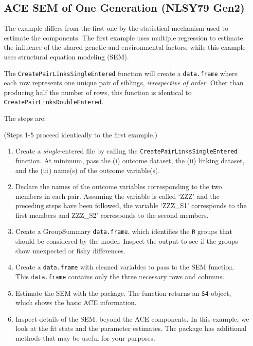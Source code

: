 \documentclass[smallextended]{svjour3}       %
\begin{document}
\hypertarget{ace-sem-of-one-generation-nlsy79-gen2}{%
\subsection{ACE SEM of One Generation (NLSY79
Gen2)}\label{ace-sem-of-one-generation-nlsy79-gen2}}

The example differs from the first one by the statistical mechanism used
to estimate the components. The first example uses multiple regression
to estimate the influence of the shared genetic and environmental
factors, while this example uses structural equation modeling (SEM).

The \texttt{CreatePairLinksSingleEntered} function will create a
\texttt{data.frame} where each row represents one unique pair of
siblings, \emph{irrespective of order}. Other than producing half the
number of rows, this function is identical to
\texttt{CreatePairLinksDoubleEntered}.

The steps are:

(Steps 1-5 proceed identically to the first example.)

\begin{enumerate}
\def\labelenumi{\arabic{enumi}.}
\setcounter{enumi}{5}
\item
  Create a \emph{single}-entered file by calling the
  \texttt{CreatePairLinksSingleEntered} function. At minimum, pass the
  (i) outcome dataset, the (ii) linking dataset, and the (iii) name(s)
  of the outcome variable(s).
\item
  Declare the names of the outcome variables corresponding to the two
  members in each pair. Assuming the variable is called `ZZZ' and the
  preceding steps have been followed, the variable `ZZZ\_S1' corresponds
  to the first members and ZZZ\_S2' corresponds to the second members.
\item
  Create a GroupSummary \texttt{data.frame}, which identifies the
  \texttt{R} groups that should be considered by the model. Inspect the
  output to see if the groups show unexpected or fishy differences.
\item
  Create a \texttt{data.frame} with cleaned variables to pass to the SEM
  function. This \texttt{data.frame} contains only the three necessary
  rows and columns.
\item
  Estimate the SEM with the  package. The function returns
  an \texttt{S4} object, which shows the basic ACE information.
\item
  Inspect details of the SEM, beyond the ACE components. In this
  example, we look at the fit stats and the parameter estimates. The
   package has additional methods that may be useful for
  your purposes.
\end{enumerate}
\end{document}
